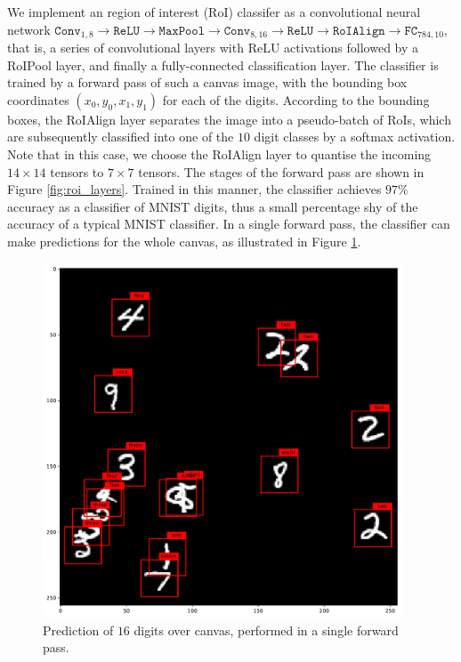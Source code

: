 We implement an region of interest (RoI) classifer as a convolutional neural network $\texttt{Conv}_{1, 8} \rightarrow \texttt{ReLU} \rightarrow \texttt{MaxPool} \rightarrow \texttt{Conv}_{8, 16} \rightarrow \texttt{ReLU} \rightarrow \texttt{RoIAlign} \rightarrow \texttt{FC}_{784, 10}$, that is, a series of convolutional layers with ReLU activations followed by a RoIPool layer, and finally a fully-connected classification layer. The classifier is trained by a forward pass of such a canvas image, with the bounding box coordinates $(x_0, y_0, x_1, y_1)$ for each of the digits. According to the bounding boxes, the RoIAlign layer separates the image into a pseudo-batch of RoIs, which are subsequently classified into one of the $10$ digit classes by a softmax activation. Note that in this case, we choose the RoIAlign layer to quantise the incoming $14\times14$ tensors to $7\times7$ tensors. The stages of the forward pass are shown in Figure \ref{fig:roi_layers}. Trained in this manner, the classifier achieves $97\%$ accuracy as a classifier of MNIST digits, thus a small percentage shy of the accuracy of a typical MNIST classifier. In a single forward pass, the classifier can make predictions for the whole canvas, as illustrated in Figure \ref{fig:roi_prediction}. 

\begin{figure}[h]
\centering
\includegraphics[width=0.95\textwidth]{img/roi_prediction.pdf}
\caption{Prediction of $16$ digits over canvas, performed in a single forward pass.}
\label{fig:roi_prediction}
\end{figure}

